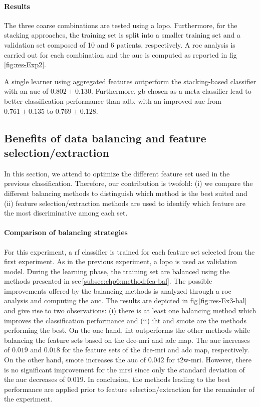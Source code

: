 \paragraph{Results}
The three coarse combinations are tested using a \ac{lopo}.
Furthermore, for the stacking approaches, the training set is split into a smaller training set and a validation set composed of 10 and 6 patients, respectively.
A \ac{roc} analysis is carried out for each combination and the \ac{auc} is computed as reported in \acs{fig}\,\ref{fig:res-Exp2}.

A single learner using aggregated features outperform the stacking-based classifier with an \ac{auc} of $0.802 \pm 0.130$.
Furthermore, \ac{gb} chosen as a meta-classifier lead to better classification performance than \ac{adb}, with an improved \ac{auc} from $0.761 \pm 0.135$ to $0.769 \pm 0.128$.

\subsection{Benefits of data balancing and feature selection/extraction}\label{subsec:chp6:exp-res:Ex3}

In this section, we attend to optimize the different feature set used in the previous classification.
Therefore, our contribution is twofold: (i) we compare the different balancing methods to distinguish which method is the best suited and (ii) feature selection/extraction methods are used to identify which feature are the most discriminative among each set.

\paragraph{Comparison of balancing strategies}
For this experiment, a \ac{rf} classifier is trained for each feature set selected from the first experiment.
As in the previous experiment, a \ac{lopo} is used as validation model.
During the learning phase, the training set are balanced using the methods presented in \acs{sec}\,\ref{subsec:chp6:method:fea-bal}.
The possible improvements offered by the balancing methods is analyzed through a \ac{roc} analysis and computing the \ac{auc}.
The results are depicted in \acs{fig}\,\ref{fig:res-Ex3-bal} and give rise to two observations:
(i) there is at least one balancing method which improves the classification performance and
(ii) \ac{iht} and \ac{smote} are the methods performing the best.
On the one hand, \ac{iht} outperforms the other methods while balancing the feature sets based on the \ac{dce}-\ac{mri} and \ac{adc} map.
The \ac{auc} increases of $0.019$ and $0.018$ for the feature sets of the \ac{dce}-\ac{mri} and \ac{adc} map, respectively.
On the other hand, \ac{smote} increases the \ac{auc} of $0.042$ for \ac{t2w}-\ac{mri}.
However, there is no significant improvement for the \ac{mrsi} since only the standard deviation of the \ac{auc} decreases of $0.019$.
In conclusion, the methods leading to the best performance are applied prior to feature selection/extraction for the remainder of the experiment.

